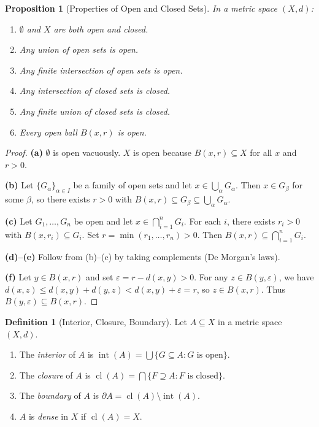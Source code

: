 \documentclass[11pt,a4paper]{article}
\theoremstyle{definition}
\newtheorem{definition}{Definition}[section]
\theoremstyle{plain}
\newtheorem{proposition}[theorem]{Proposition}
\theoremstyle{remark}
\DeclareMathOperator{\Int}{int}
\DeclareMathOperator{\cl}{cl}
\begin{document}
\begin{proposition}[Properties of Open and Closed Sets]
\label{prop:open_closed}
In a metric space $(X,d)$:
\begin{enumerate}[nosep,label=(\alph*)]
    \item $\emptyset$ and $X$ are both open and closed.
    \item Any union of open sets is open.
    \item Any finite intersection of open sets is open.
    \item Any intersection of closed sets is closed.
    \item Any finite union of closed sets is closed.
    \item Every open ball $B(x,r)$ is open.
\end{enumerate}
\end{proposition}

\begin{proof}
\textbf{(a)} $\emptyset$ is open vacuously. $X$ is open because $B(x,r) \subseteq X$
for all $x$ and $r > 0$.

\textbf{(b)} Let $\{G_\alpha\}_{\alpha \in I}$ be a family of open sets and let
$x \in \bigcup_\alpha G_\alpha$. Then $x \in G_\beta$ for some $\beta$, so there
exists $r > 0$ with $B(x,r) \subseteq G_\beta \subseteq \bigcup_\alpha G_\alpha$.

\textbf{(c)} Let $G_1, \ldots, G_n$ be open and let $x \in \bigcap_{i=1}^n G_i$.
For each $i$, there exists $r_i > 0$ with $B(x,r_i) \subseteq G_i$. Set
$r = \min(r_1, \ldots, r_n) > 0$. Then $B(x,r) \subseteq \bigcap_{i=1}^n G_i$.

\textbf{(d)--(e)} Follow from (b)--(c) by taking complements (De Morgan's laws).

\textbf{(f)} Let $y \in B(x,r)$ and set $\varepsilon = r - d(x,y) > 0$. For any
$z \in B(y,\varepsilon)$, we have $d(x,z) \le d(x,y) + d(y,z) < d(x,y) +
\varepsilon = r$, so $z \in B(x,r)$. Thus $B(y,\varepsilon) \subseteq B(x,r)$.
\end{proof}

\begin{definition}[Interior, Closure, Boundary]
\label{def:int_cl_bd}
Let $A \subseteq X$ in a metric space $(X,d)$.
\begin{enumerate}[nosep,label=(\roman*)]
    \item The \emph{interior} of $A$ is $\Int(A) = \bigcup \{G \subseteq A : G \text{ is open}\}$.
    \item The \emph{closure} of $A$ is $\cl(A) = \bigcap \{F \supseteq A : F \text{ is closed}\}$.
    \item The \emph{boundary} of $A$ is $\partial A = \cl(A) \setminus \Int(A)$.
    \item $A$ is \emph{dense} in $X$ if $\cl(A) = X$.
\end{enumerate}
\end{definition}
\end{document}
